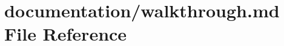 \hypertarget{walkthrough_8md}{}\section{documentation/walkthrough.md File Reference}
\label{walkthrough_8md}
